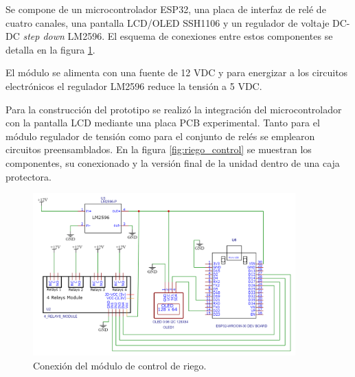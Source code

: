 Se compone de un microcontrolador ESP32, una placa de interfaz de relé de cuatro canales, una pantalla LCD/OLED SSH1106 y un regulador de voltaje DC-DC \textit{step down} LM2596. El esquema de conexiones entre estos componentes se detalla en la figura \ref{fig:riegochem}.

El módulo se alimenta con una fuente de 12 VDC y para energizar a los circuitos electrónicos el regulador LM2596 reduce la tensión a 5 VDC.

Para la construcción del prototipo se realizó la integración del microcontrolador con la pantalla LCD mediante una placa PCB experimental. Tanto para el módulo regulador de tensión como para el conjunto de relés se emplearon circuitos preensamblados. En la figura \ref{fig:riego_control} se muestran los componentes, su conexionado y la versión final de la unidad dentro de una caja protectora.   


\begin{figure}[!h]
	\centering
	\includegraphics[width=0.9\textwidth]{./Figures/pump_schem.png}
	\caption[Conexión del módulo de control de riego]{Conexión del módulo de control de riego.}
	\label{fig:riegochem}
\end{figure}



